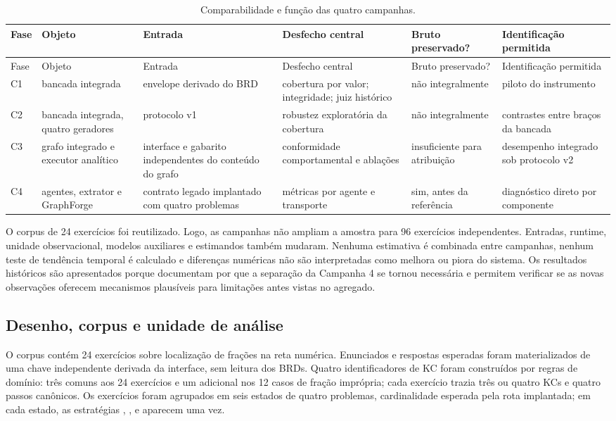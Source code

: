 \documentclass[11pt,a4paper]{article}
\begin{document}
\begingroup
\footnotesize
\setlength{\tabcolsep}{3pt}
\begin{longtable}{@{}P{1.15cm}P{2.65cm}P{3.0cm}P{3.25cm}P{1.65cm}P{2.55cm}@{}}
\caption{Comparabilidade e função das quatro campanhas.}\label{tab:campaigns}\\
\toprule
Fase & Objeto & Entrada & Desfecho central & Bruto preservado? & Identificação permitida \\
\midrule
\endfirsthead
\toprule
Fase & Objeto & Entrada & Desfecho central & Bruto preservado? & Identificação permitida \\
\midrule
\endhead
C1 & bancada integrada & envelope derivado do BRD & cobertura por valor; integridade; juiz histórico & não integralmente & piloto do instrumento \\
C2 & bancada integrada, quatro geradores & protocolo v1 & robustez exploratória da cobertura & não integralmente & contrastes entre braços da bancada \\
C3 & grafo integrado e executor analítico & interface e gabarito independentes do conteúdo do grafo & conformidade comportamental e ablações & insuficiente para atribuição & desempenho integrado sob protocolo v2 \\
C4 & agentes, extrator e GraphForge & contrato legado implantado com quatro problemas & métricas por agente e transporte & sim, antes da referência & diagnóstico direto por componente \\
\bottomrule
\end{longtable}
\endgroup

O corpus de 24 exercícios foi reutilizado. Logo, as campanhas não ampliam a amostra para 96 exercícios independentes. Entradas, runtime, unidade observacional, modelos auxiliares e estimandos também mudaram. Nenhuma estimativa é combinada entre campanhas, nenhum teste de tendência temporal é calculado e diferenças numéricas não são interpretadas como melhora ou piora do sistema. Os resultados históricos são apresentados porque documentam por que a separação da Campanha 4 se tornou necessária e permitem verificar se as novas observações oferecem mecanismos plausíveis para limitações antes vistas no agregado.

\subsection{Desenho, corpus e unidade de análise}

O corpus  contém 24 exercícios sobre localização de frações na reta numérica. Enunciados e respostas esperadas foram materializados de uma chave independente derivada da interface, sem leitura dos BRDs. Quatro identificadores de KC foram construídos por regras de domínio: três comuns aos 24 exercícios e um adicional nos 12 casos de fração imprópria; cada exercício trazia três ou quatro KCs e quatro passos canônicos. Os exercícios foram agrupados em seis estados de quatro problemas, cardinalidade esperada pela rota implantada; em cada estado, as estratégias , ,  e  aparecem uma vez.
\end{document}
